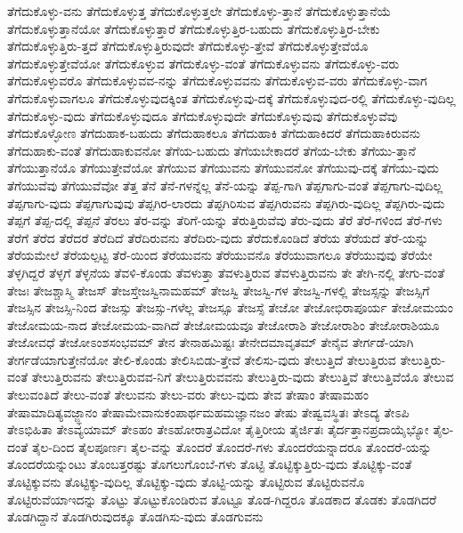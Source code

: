 {ತೆಗೆದುಕೊಳ್ಳು-ವನು
ತೆಗೆದುಕೊಳ್ಳುತ್ತ
ತೆಗೆದುಕೊಳ್ಳುತ್ತಲೇ
ತೆಗೆದುಕೊಳ್ಳು-ತ್ತಾನೆ
ತೆಗೆದುಕೊಳ್ಳುತ್ತಾನೆಯೆ
ತೆಗೆದುಕೊಳ್ಳುತ್ತಾನೆಯೋ
ತೆಗೆದುಕೊಳ್ಳುತ್ತಾರೆ
ತೆಗೆದುಕೊಳ್ಳುತ್ತಿರ-ಬಹುದು
ತೆಗೆದುಕೊಳ್ಳುತ್ತಿರ-ಬೇಕು
ತೆಗೆದುಕೊಳ್ಳುತ್ತಿರು-ತ್ತದೆ
ತೆಗೆದುಕೊಳ್ಳುತ್ತಿರುವುದೇ
ತೆಗೆದುಕೊಳ್ಳು-ತ್ತೇವೆ
ತೆಗೆದುಕೊಳ್ಳುತ್ತೇವೆಯೊ
ತೆಗೆದುಕೊಳ್ಳುತ್ತೇವೆಯೋ
ತೆಗೆದುಕೊಳ್ಳುವ
ತೆಗೆದುಕೊಳ್ಳು-ವಂತೆ
ತೆಗೆದುಕೊಳ್ಳುವನು
ತೆಗೆದುಕೊಳ್ಳು-ವರು
ತೆಗೆದುಕೊಳ್ಳುವರೊ
ತೆಗೆದುಕೊಳ್ಳುವವ-ನನ್ನು
ತೆಗೆದುಕೊಳ್ಳುವವನು
ತೆಗೆದುಕೊಳ್ಳುವ-ವರು
ತೆಗೆದುಕೊಳ್ಳು-ವಾಗ
ತೆಗೆದುಕೊಳ್ಳುವಾಗಲೂ
ತೆಗೆದುಕೊಳ್ಳುವುದಕ್ಕಿಂತ
ತೆಗೆದುಕೊಳ್ಳುವು-ದಕ್ಕೆ
ತೆಗೆದುಕೊಳ್ಳುವುದ-ರಲ್ಲಿ
ತೆಗೆದುಕೊಳ್ಳು-ವುದಿಲ್ಲ
ತೆಗೆದುಕೊಳ್ಳು-ವುದು
ತೆಗೆದುಕೊಳ್ಳುವುದೂ
ತೆಗೆದುಕೊಳ್ಳುವುದೇ
ತೆಗೆದುಕೊಳ್ಳುವುವು
ತೆಗೆದುಕೊಳ್ಳುವೆವು
ತೆಗೆದುಕೊಳ್ಳೋಣ
ತೆಗೆದುಹಾಕ-ಬಹುದು
ತೆಗೆದುಹಾಕಲೂ
ತೆಗೆದುಹಾಕಿ
ತೆಗೆದುಹಾಕಿದರೆ
ತೆಗೆದುಹಾಕಿರುವನು
ತೆಗೆದುಹಾಕು-ವಂತೆ
ತೆಗೆದುಹಾಕುವನೋ
ತೆಗೆಯ-ಬಹುದು
ತೆಗೆಯಬೇಕಾದರೆ
ತೆಗೆಯ-ಬೇಕು
ತೆಗೆಯು-ತ್ತಾನೆ
ತೆಗೆಯುತ್ತಾನೆಯೊ
ತೆಗೆಯುತ್ತೇವೆಯೋ
ತೆಗೆಯುವ
ತೆಗೆಯುವನು
ತೆಗೆಯುವನೋ
ತೆಗೆಯುವು-ದಕ್ಕೆ
ತೆಗೆಯು-ವುದು
ತೆಗೆಯುವೆವು
ತೆಗೆಯುವೆವೋ
ತೆತ್ತ
ತೆನೆ
ತೆನೆ-ಗಳನ್ನೆಲ್ಲ
ತೆನೆ-ಯನ್ನು
ತೆಪ್ಪ-ಗಾಗಿ
ತೆಪ್ಪಗಾಗು-ವಂತೆ
ತೆಪ್ಪಗಾಗು-ವುದಿಲ್ಲ
ತೆಪ್ಪಗಾಗು-ವುದು
ತೆಪ್ಪಗಾಗುವುವು
ತೆಪ್ಪಗಿರ-ಲಾರದು
ತೆಪ್ಪಗಿರಿಸುವ
ತೆಪ್ಪಗಿರುವನು
ತೆಪ್ಪಗಿರು-ವುದಿಲ್ಲ
ತೆಪ್ಪಗಿರು-ವುದು
ತೆಪ್ಪಗೆ
ತೆಪ್ಪ-ದಲ್ಲಿ
ತೆಪ್ಪನೆ
ತೆರಲು
ತೆರ-ವನ್ನು
ತೆರಿಗೆ-ಯನ್ನು
ತೆರುತ್ತಿರುವೆವು
ತೆರು-ವುದು
ತೆರೆ
ತೆರೆ-ಗಳಿಂದ
ತೆರೆ-ಗಳು
ತೆರೆಗೆ
ತೆರೆದ
ತೆರೆದರೆ
ತೆರೆದಿದೆ
ತೆರೆದಿರುವನು
ತೆರೆದಿರು-ವುದು
ತೆರೆದುಕೊಂಡಿದೆ
ತೆರೆಯ
ತೆರೆಯದೆ
ತೆರೆ-ಯನ್ನು
ತೆರೆಯಮೇಲೆ
ತೆರೆಯಲ್ಪಟ್ಟ
ತೆರೆ-ಯಿಂದ
ತೆರೆಯುವನು
ತೆರೆಯುವನೊ
ತೆರೆಯುವಾಗಲೂ
ತೆರೆಯುವುವು
ತೆರೆಯೇ
ತೆಳ್ಳಗಿದ್ದರೆ
ತೆಳ್ಳಗೆ
ತೆಳ್ಳನೆಯ
ತೆವಳಿ-ಕೊಂಡು
ತೆವಳುತ್ತಾ
ತೆವಳುತ್ತಿರುವ
ತೆವಳುತ್ತಿರುವನು
ತೇ
ತೇಗಿ-ನಲ್ಲಿ
ತೇಗು-ವಂತೆ
ತೇಜಃ
ತೇಜಶ್ಚಾಸ್ಮಿ
ತೇಜಸ್
ತೇಜಸ್ತೇಜಸ್ವಿನಾಮಹಮ್
ತೇಜಸ್ವಿ
ತೇಜಸ್ವಿ-ಗಳ
ತೇಜಸ್ವಿ-ಗಳಲ್ಲಿ
ತೇಜಸ್ಸನ್ನು
ತೇಜಸ್ಸಿಗೆ
ತೇಜಸ್ಸಿನ
ತೇಜಸ್ಸಿ-ನಿಂದ
ತೇಜಸ್ಸು
ತೇಜಸ್ಸು-ಗಳೆಲ್ಲ
ತೇಜಸ್ಸೂ
ತೇಜಸ್ಸೆ
ತೇಜೋ
ತೇಜೋಭಿರಾಪೂರ್ಯ
ತೇಜೋಮಯಂ
ತೇಜೋಮಯ-ನಾದ
ತೇಜೋಮಯ-ವಾಗಿದೆ
ತೇಜೋಮಯವೂ
ತೇಜೋರಾಶಿ
ತೇಜೋರಾಶಿಂ
ತೇಜೋರಾಶಿಯೂ
ತೇಜೋವಧೆ
ತೇಜೋಽಂಶಸಂಭವಮ್
ತೇನ
ತೇನಾಹಮಿಷ್ಟಃ
ತೇನೇದಮಾವೃತಮ್
ತೇನೈವ
ತೇರ್ಗಡೆ-ಯಾಗಿ
ತೇರ್ಗಡೆಯಾಗುತ್ತೇನೆಯೋ
ತೇಲಿ-ಕೊಂಡು
ತೇಲಿಸಿಬಿಡು-ತ್ತೇವೆ
ತೇಲಿಸು-ವುದು
ತೇಲುತ್ತಿದೆ
ತೇಲುತ್ತಿರುವ
ತೇಲುತ್ತಿರು-ವಂತೆ
ತೇಲುತ್ತಿರುವನು
ತೇಲುತ್ತಿರುವವ-ನಿಗೆ
ತೇಲುತ್ತಿರುವವನು
ತೇಲುತ್ತಿರು-ವುದು
ತೇಲುತ್ತಿವೆ
ತೇಲುತ್ತಿವೆಯೊ
ತೇಲುವ
ತೇಲುವಂತಿದೆ
ತೇಲು-ವಂತೆ
ತೇಲುವನು
ತೇಲು-ವರು
ತೇಲು-ವುದು
ತೇವ
ತೇಷಾಂ
ತೇಷಾಮಹಂ
ತೇಷಾಮಾದಿತ್ಯವಜ್ಜ್ಞಾನಂ
ತೇಷಾಮೇವಾನುಕಂಪಾರ್ಥಮಹಮಜ್ಞಾನಜಂ
ತೇಷು
ತೇಷ್ವವಸ್ಥಿತಃ
ತೇಽದ್ಯ
ತೇಽಪಿ
ತೇಽಭಿಹಿತಾ
ತೇಽವ್ಯಯಾಮ್
ತೇಽಹಂ
ತೇಽಹೋರಾತ್ರವಿದೋ
ತೈತ್ತಿರೀಯ
ತೈರ್ಜಿತಃ
ತೈರ್ದತ್ತಾನಪ್ರದಾಯೈಭ್ಯೋ
ತೈಲ-ದಂತೆ
ತೈಲ-ದಿಂದ
ತೈಲಪೂರ್ಣಃ
ತೈಲ-ವನ್ನು
ತೊಂದರೆ
ತೊಂದರೆ-ಗಳು
ತೊಂದರೆಯನ್ನಾದರೂ
ತೊಂದರೆ-ಯನ್ನು
ತೊಂದರೆಯನ್ನುಂಟು
ತೊಂಬತ್ತರಷ್ಟು
ತೊಗಲುಗೊಂಬೆ-ಗಳು
ತೊಟ್ಟಿ
ತೊಟ್ಟಿಕ್ಕುತ್ತಿರು-ವುದು
ತೊಟ್ಟಿಕ್ಕು-ವಂತೆ
ತೊಟ್ಟಿಕ್ಕುವನು
ತೊಟ್ಟಿಕ್ಕು-ವುದಿಲ್ಲ
ತೊಟ್ಟಿಕ್ಕು-ವುದು
ತೊಟ್ಟಿ-ಯನ್ನು
ತೊಟ್ಟಿರುವ
ತೊಟ್ಟಿರುವನೊ
ತೊಟ್ಟಿರುವೆಯಾಇದನ್ನು
ತೊಟ್ಟು
ತೊಟ್ಟುಕೊಂಡಿರುವ
ತೊಟ್ಟೂ
ತೊಡ-ಗಿದ್ದರೂ
ತೊಡಕಾದ
ತೊಡಕು
ತೊಡಗಿದರೆ
ತೊಡಗಿದ್ದಾನೆ
ತೊಡಗಿರುವುದಕ್ಕೂ
ತೊಡಗಿಸು-ವುದು
ತೊಡಗುವನು
}
